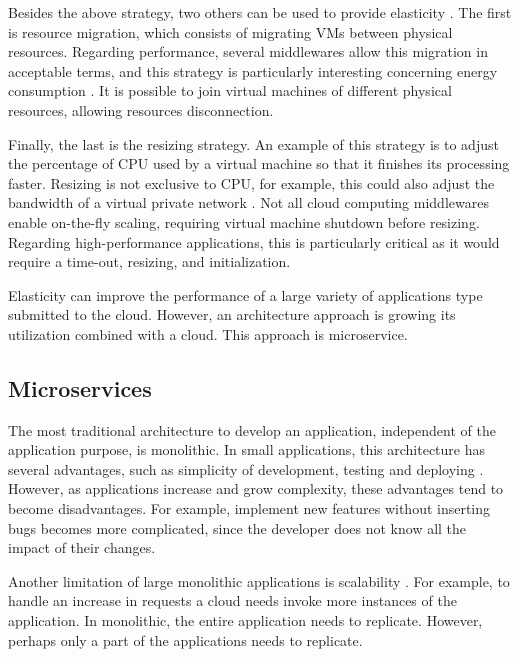 Besides the above strategy, two others can be used to provide elasticity \cite{Righi2013ElasticidadeDesafios}. The first is resource migration, which consists of migrating VMs between physical resources. Regarding performance, several middlewares allow this migration in acceptable terms, and this strategy is particularly interesting concerning energy consumption \cite{Righi2013ElasticidadeDesafios}. It is possible to join virtual machines of different physical resources, allowing resources disconnection.

Finally, the last is the resizing strategy. An example of this strategy is to adjust the percentage of CPU used by a virtual machine so that it finishes its processing faster. Resizing is not exclusive to CPU, for example, this could also adjust the bandwidth of a virtual private network \cite{Righi2013ElasticidadeDesafios}. Not all cloud computing middlewares enable on-the-fly scaling, requiring virtual machine shutdown before resizing. Regarding high-performance applications, this is particularly critical as it would require a time-out, resizing, and initialization.

Elasticity can improve the performance of a large variety of applications type submitted to the cloud. However, an architecture approach is growing its utilization combined with a cloud. This approach is microservice.

\subsection{Microservices}

The most traditional architecture to develop an application, independent of the application purpose, is monolithic. In small applications, this architecture has several advantages, such as simplicity of development, testing and deploying \cite{Chen2017FromApproach}. However, as applications increase and grow complexity, these advantages tend to become disadvantages. For example, implement new features without inserting bugs becomes more complicated, since the developer does not know all the impact of their changes. 

Another limitation of large monolithic applications is scalability \cite{Chen2017FromApproach}. For example, to handle an increase in requests a cloud needs invoke more instances of the application. In monolithic, the entire application needs to replicate. However, perhaps only a part of the applications needs to replicate.

